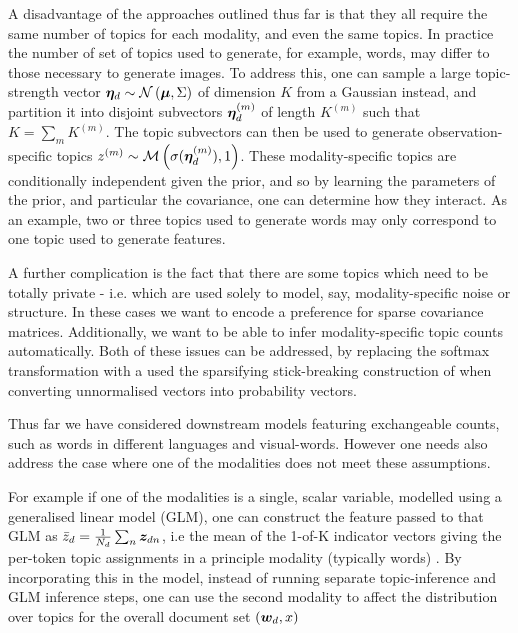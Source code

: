 A disadvantage of the approaches outlined thus far is that they all require the same number of topics for each modality, and even the same topics. In practice the number of set of topics used to generate, for example, words, may differ to those necessary to generate images. To address this, one can sample a large topic-strength vector $\bm \eta_d \sim \mathcal{N} \left( {\bm \mu}, {\Sigma} \right)$ of dimension $K$ from a Gaussian instead, and partition it into disjoint subvectors $\bm \eta_d^{(m)}$ of length $K^{(m)}$ such that $K = \sum_m K^{(m)}$. The topic subvectors can then be used to generate observation-specific topics $z^{(m)} \sim \mathcal{M} \left( {\sigma(\bm \eta_d^{(m)})},{1} \right)$. These modality-specific topics are conditionally independent given the prior, and so by learning the parameters of the prior, and particular the covariance, one can determine how they interact\cite{Salomatin2009}. As an example, two or three topics used to generate words may only correspond to one topic used to generate features.

A further complication is the fact that there are some topics which need to be totally private - i.e. which are used solely to model, say, modality-specific noise or structure. In these cases we want to encode a preference for sparse covariance matrices. Additionally, we want to be able to infer modality-specific topic counts automatically. Both of these issues can be addressed, by replacing the softmax transformation with a used the sparsifying stick-breaking construction of \cite{Paisley2012} when converting unnormalised vectors into probability vectors\cite{Virtanen2012a}.

Thus far we have considered downstream models featuring exchangeable counts, such as words in different languages and visual-words. However one needs also address the case where one of the modalities does not meet these assumptions.

For example if one of the modalities is a single, scalar variable, modelled using a generalised linear model (GLM), one can construct the feature passed to that GLM as $\bar{z}_d = \frac{1}{N_d} \sum_n \bm z_{dn}$, i.e the mean of the 1-of-K indicator vectors giving the per-token topic assignments in a principle modality (typically words) \cite{Blei2008}. By incorporating this in the model, instead of running separate topic-inference and GLM inference steps, one can use the second modality to affect the distribution over topics for the overall document set $({ \bm w_d }, x)$


